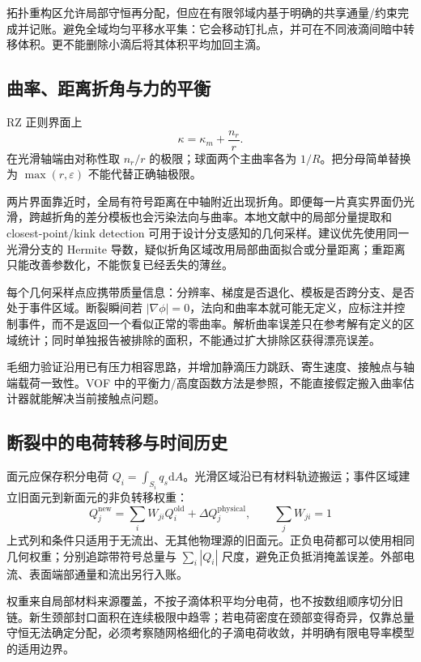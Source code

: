 \documentclass[11pt,a4paper]{article}
\newcommand{\dd}{\mathrm{d}}
\begin{document}
拓扑重构区允许局部守恒再分配，但应在有限邻域内基于明确的共享通量/约束完成并记账。避免全域均匀平移水平集：它会移动钉扎点，并可在不同液滴间暗中转移体积。更不能删除小滴后将其体积平均加回主滴。

\subsection{曲率、距离折角与力的平衡}
RZ 正则界面上
\begin{equation}
\kappa=\kappa_m+\frac{n_r}{r}.
\end{equation}
在光滑轴端由对称性取 $n_r/r$ 的极限；球面两个主曲率各为 $1/R$。把分母简单替换为 $\max(r,\varepsilon)$ 不能代替正确轴极限。

两片界面靠近时，全局有符号距离在中轴附近出现折角。即便每一片真实界面仍光滑，跨越折角的差分模板也会污染法向与曲率。本地文献中的局部分量提取和 closest-point/kink detection 可用于设计分支感知的几何采样\cite{ervik2014,henri2022}。建议优先使用同一光滑分支的 Hermite 导数，疑似折角区域改用局部曲面拟合或分量距离；重距离只能改善参数化，不能恢复已经丢失的薄丝。

每个几何采样点应携带质量信息：分辨率、梯度是否退化、模板是否跨分支、是否处于事件区域。断裂瞬间若 $|\nabla\phi|=0$，法向和曲率本就可能无定义，应标注并控制事件，而不是返回一个看似正常的零曲率。解析曲率误差只在参考解有定义的区域统计；同时单独报告被排除的面积，不能通过扩大排除区获得漂亮误差。

毛细力验证沿用已有压力相容思路，并增加静滴压力跳跃、寄生速度、接触点与轴端载荷一致性。VOF 中的平衡力/高度函数方法是参照\cite{popinet2009}，不能直接假定搬入曲率估计器就能解决当前接触点问题。

\subsection{断裂中的电荷转移与时间历史}
面元应保存积分电荷 $Q_i=\int_{S_i}q_s\dd A$。光滑区域沿已有材料轨迹搬运；事件区域建立旧面元到新面元的非负转移权重：
\begin{equation}
Q_j^{\mathrm{new}}=\sum_i W_{ji}Q_i^{\mathrm{old}}+\Delta Q_j^{\mathrm{physical}},
\qquad \sum_j W_{ji}=1
\end{equation}
上式列和条件只适用于无流出、无其他物理源的旧面元。正负电荷都可以使用相同几何权重；分别追踪带符号总量与 $\sum_i|Q_i|$ 尺度，避免正负抵消掩盖误差。外部电流、表面端部通量和流出另行入账。

权重来自局部材料来源覆盖，不按子滴体积平均分电荷，也不按数组顺序切分旧链。新生颈部封口面积在连续极限中趋零；若电荷密度在颈部变得奇异，仅靠总量守恒无法确定分配，必须考察随网格细化的子滴电荷收敛，并明确有限电导率模型的适用边界。
\end{document}
